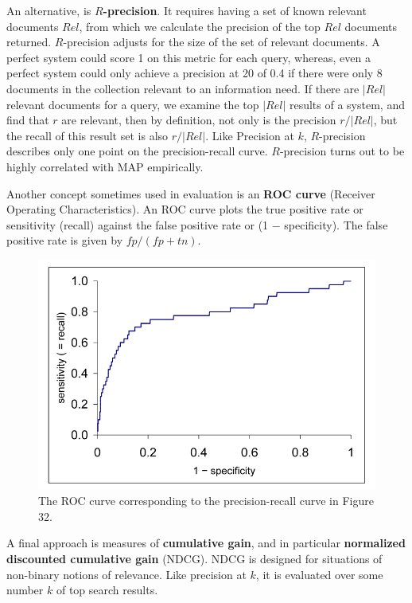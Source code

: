 \documentclass[letterpaper,11pt]{article}
\begin{document}
An alternative, is \textbf{$R$-precision}. It requires having a set of known relevant documents $Rel$, from which we calculate the precision of the top $Rel$ documents returned. $R$-precision adjusts for the size of the set of relevant documents. A perfect system could score 1 on this metric for each query, whereas, even a perfect system could only achieve a precision at 20 of 0.4 if there were only 8 documents in the collection relevant to an information need. If there are $|Rel|$ relevant documents for a query, we examine the top $|Rel|$ results of a system, and find that $r$ are relevant, then by definition, not only is the precision $r/|Rel|$, but the recall of this result set is also $r/|Rel|$. Like Precision at $k$, $R$-precision describes only one point on the precision-recall curve. $R$-precision turns out to be highly correlated with MAP empirically.

Another concept sometimes used in evaluation is an \textbf{ROC curve} (Receiver Operating Characteristics). An ROC curve plots the true positive rate or sensitivity (recall) against the false positive rate or (1 − specificity). The false positive rate is given by $fp / (fp + tn)$.
\begin{figure}[H]
    \centering
    \includegraphics[scale=0.55]{sect8/figure_8_4.png}
    \caption{The ROC curve corresponding to the precision-recall curve in Figure 32.}
\end{figure}

A final approach is measures of \textbf{cumulative gain}, and in particular \textbf{normalized discounted cumulative gain} (NDCG). NDCG is designed for situations of non-binary notions of relevance. Like precision at $k$, it is evaluated over some number $k$ of top search results. %
\end{document}
